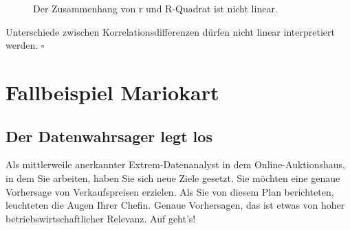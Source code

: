 \documentclass[
  letterpaper,
]{scrbook}
\theoremstyle{definition}
\theoremstyle{definition}
\theoremstyle{definition}
\theoremstyle{remark}
\begin{document}
\begin{figure}


\caption{\label{fig-r-r2}Der Zusammenhang von r und R-Quadrat ist nicht
linear.}

\end{figure}%

\begin{tcolorbox}[enhanced jigsaw, colbacktitle=quarto-callout-caution-color!10!white, toptitle=1mm, colframe=quarto-callout-caution-color-frame, breakable, toprule=.15mm, bottomrule=.15mm, bottomtitle=1mm, left=2mm, opacitybacktitle=0.6, colback=white, arc=.35mm, coltitle=black, title=\textcolor{quarto-callout-caution-color}{\faFire}\hspace{0.5em}{Vorsicht}, opacityback=0, rightrule=.15mm, leftrule=.75mm, titlerule=0mm]

Unterschiede zwischen Korrelationsdifferenzen dürfen nicht linear
interpretiert werden. \(\square\)

\end{tcolorbox}

\section{Fallbeispiel Mariokart}\label{fallbeispiel-mariokart}

\subsection{Der Datenwahrsager legt
los}\label{der-datenwahrsager-legt-los}

Als mittlerweile anerkannter Extrem-Datenanalyst in dem
Online-Auktionshaus, in dem Sie arbeiten, haben Sie sich neue Ziele
gesetzt. Sie möchten eine genaue Vorhersage von Verkaufspreisen
erzielen. Als Sie von diesem Plan berichteten, leuchteten die Augen
Ihrer Chefin. Genaue Vorhersagen, das ist etwas von hoher
betriebswirtschaftlicher Relevanz. Auf geht's!
\end{document}
